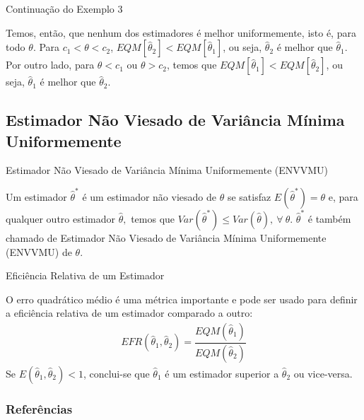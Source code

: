 \documentclass[12pt]{beamer}
\begin{document}
\begin{frame}{Continuação do Exemplo 3}
\begin{block}{}
\justifying
Temos, então, que nenhum dos estimadores é melhor uniformemente, isto é, para todo $\theta$. Para $c_1 < \theta < c_2$, $EQM[\hat{\theta}_2] < EQM[\hat{\theta}_1]$, ou seja, $\hat{\theta}_2$ é melhor que $\hat{\theta}_1$. Por outro lado, para $\theta < c_1$ ou $\theta > c_2$, temos que $EQM[\hat{\theta}_1] < EQM[\hat{\theta}_2]$, ou seja, $\hat{\theta}_1$ é melhor que $\hat{\theta}_2$.
\end{block}
\end{frame}

\subsection{Estimador Não Viesado de Variância Mínima Uniformemente}
\begin{frame}{Estimador Não Viesado de Variância Mínima Uniformemente (ENVVMU)}
\begin{block}{}
\justifying
Um estimador $\hat{\theta}^{*}$ é um estimador não viesado de $\theta$ se satisfaz $E(\hat{\theta}^{*})=\theta$ e, para qualquer outro estimador $\hat{\theta},$ temos que $Var(\hat{\theta}^{*})\leq Var(\hat{\theta}),~\forall~ \theta.$ $\hat{\theta}^{*}$ é também chamado de Estimador Não Viesado de Variância Mínima Uniformemente (ENVVMU) de $\theta.$
\end{block}
\end{frame}

\begin{frame}{Eficiência Relativa de um Estimador}
\begin{block}{}
\justifying
O erro quadrático médio é uma métrica importante e pode ser usado para definir a eficiência relativa de um estimador comparado a outro:
\begin{align*}
    EFR(\hat{\theta}_{1}, \hat{\theta}_{2})=\dfrac{EQM(\hat{\theta}_{1})}{EQM(\hat{\theta}_{2})}
\end{align*}
Se $E(\hat{\theta}_1, \hat{\theta}_2) < 1$, conclui-se que $\hat{\theta}_1$ é um estimador superior a $\hat{\theta}_2$ ou vice-versa.
\end{block}
\end{frame}

\begin{frame}[allowframebreaks]
\frametitle{\bf Referências}
\printbibliography
\end{frame}
\end{document}
